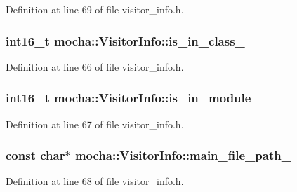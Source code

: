 Definition at line 69 of file visitor\_\-info.h.

\hypertarget{classmocha_1_1_visitor_info_a7a8ce456413d36fd7a00bdb9e1dc6921}{
\subsubsection[{is\_\-in\_\-class\_\-}]{\setlength{\rightskip}{0pt plus 5cm}int16\_\-t {\bf mocha::VisitorInfo::is\_\-in\_\-class\_\-}}}
\label{classmocha_1_1_visitor_info_a7a8ce456413d36fd7a00bdb9e1dc6921}


Definition at line 66 of file visitor\_\-info.h.

\hypertarget{classmocha_1_1_visitor_info_a28cd0d4098500b5070101411d191e0c4}{
\subsubsection[{is\_\-in\_\-module\_\-}]{\setlength{\rightskip}{0pt plus 5cm}int16\_\-t {\bf mocha::VisitorInfo::is\_\-in\_\-module\_\-}}}
\label{classmocha_1_1_visitor_info_a28cd0d4098500b5070101411d191e0c4}


Definition at line 67 of file visitor\_\-info.h.

\hypertarget{classmocha_1_1_visitor_info_a918cdbf0e9379e84aa2378d5bc0ca8b6}{
\subsubsection[{main\_\-file\_\-path\_\-}]{\setlength{\rightskip}{0pt plus 5cm}const char$\ast$ {\bf mocha::VisitorInfo::main\_\-file\_\-path\_\-}}}
\label{classmocha_1_1_visitor_info_a918cdbf0e9379e84aa2378d5bc0ca8b6}


Definition at line 68 of file visitor\_\-info.h.

